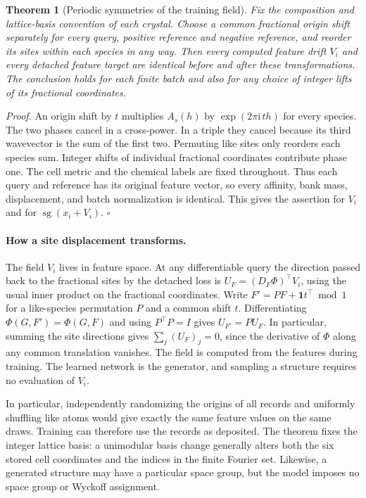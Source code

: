 \documentclass[10pt]{article}
\newcommand{\sg}{\operatorname{sg}}
\newtheorem{fieldtheorem}{Theorem}
\begin{document}
\begin{fieldtheorem}[Periodic symmetries of the training field]\label{thm:periodic-field}
Fix the composition and lattice-basis convention of each crystal. Choose a common fractional origin shift separately for every query, positive reference and negative reference, and reorder its sites within each species in any way. Then every computed feature drift $V_i$ and every detached feature target are identical before and after these transformations. The conclusion holds for each finite batch and also for any choice of integer lifts of its fractional coordinates.
\end{fieldtheorem}
\noindent\emph{Proof.} An origin shift by $t$ multiplies $A_s(h)$ by $\exp(2\pi\mathrm{i}\,th)$ for every species. The two phases cancel in a cross-power. In a triple they cancel because its third wavevector is the sum of the first two. Permuting like sites only reorders each species sum. Integer shifts of individual fractional coordinates contribute phase one. The cell metric and the chemical labels are fixed throughout. Thus each query and reference has its original feature vector, so every affinity, bank mass, displacement, and batch normalization is identical. This gives the assertion for $V_i$ and for $\sg(x_i+V_i)$. \hfill$\square$

\paragraph{How a site displacement transforms.}
The field $V_i$ lives in feature space. At any differentiable query the direction passed back to the fractional sites by the detached loss is $U_F=(D_F\Phi)^\top V_i$, using the usual inner product on the fractional coordinates. Write $F'=PF+\mathbf 1t^\top\bmod 1$ for a like-species permutation $P$ and a common shift $t$. Differentiating $\Phi(G,F')=\Phi(G,F)$ and using $P^\top P=I$ gives $U_{F'}=P U_F$. In particular, summing the site directions gives $\sum_j(U_F)_j=0$, since the derivative of $\Phi$ along any common translation vanishes. The field is computed from the features during training. The learned network is the generator, and sampling a structure requires no evaluation of $V_i$.

In particular, independently randomizing the origins of all records and uniformly shuffling like atoms would give exactly the same feature values on the same draws. Training can therefore use the records as deposited. The theorem fixes the integer lattice basis: a unimodular basis change generally alters both the six stored cell coordinates and the indices in the finite Fourier set. Likewise, a generated structure may have a particular space group, but the model imposes no space group or Wyckoff assignment.
\end{document}
